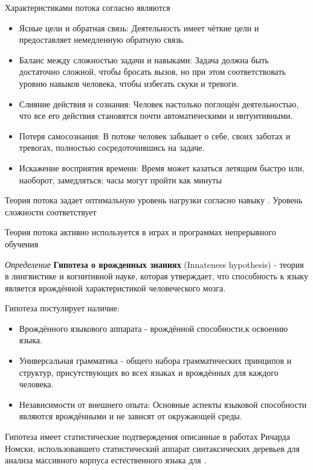 Характеристиками потока согласно \cite{csikszentmihalyi2005flow} являются \begin{itemize}
    \item Ясные цели и обратная связь: Деятельность имеет чёткие цели и предоставляет немедленную обратную связь.
    \item Баланс между сложностью задачи и навыками: Задача должна быть достаточно сложной, чтобы бросать вызов, но при этом соответствовать уровню навыков человека, чтобы избегать скуки и тревоги.
    \item Слияние действия и сознания: Человек настолько поглощён деятельностью, что все его действия становятся почти автоматическими и интуитивными.
    \item Потеря самосознания: В потоке человек забывает о себе, своих заботах и тревогах, полностью сосредоточившись на задаче.
    \item Искажение восприятия времени: Время может казаться летящим быстро или, наоборот, замедляться; часы могут пройти как минуты
\end{itemize}

Теория потока задает оптимальную уровень нагрузки согласно навыку \cite{csikszentmihalhi2020finding}. Уровень сложности соответствует

Теория потока активно используется в играх \cite{chen2007flow} и программах непрерывного обучения \cite{jarvis2009routledge}

\textit{Определение} \textbf{Гипотеза о врожденных знаниях} (Innateness hypothesis) - теория в лингвистике и когнитивной науке,
 которая утверждает, что способность к языку является врождённой характеристикой человеческого мозга. 

Гипотеза постулирует наличие:
\begin{itemize}
    \item Врождённого языкового аппарата - врождённой способности,к освоению языка.
    \item Универсальная грамматика - общего набора грамматических принципов и структур, присутствующих во всех языках и врождённых для каждого человека.
    \item Независимости от внешнего опыта: Основные аспекты языковой способности являются врождёнными и не зависят от окружающей среды.
\end{itemize}

Гипотеза имеет статистические подтверждения описанные в работах Ричарда Номски,
использовавшего статистический аппарат синтаксических деревьев для анализа массивного
корпуса естественного языка для  \cite{everaert2015structures}\cite{montague1970universal}.




